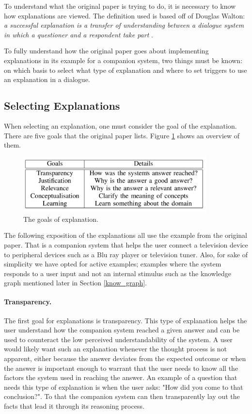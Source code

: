 \documentclass[a4paper]{article}
\begin{document}
To understand what the original paper is trying to do, it is necessary to know how explanations are viewed. The definition used is based off of Douglas Walton: {\it a successful explanation is a transfer of understanding between a dialogue system in which a questioner and a respondent take part} \cite{walton2004new}.

To fully understand how the original paper goes about implementing explanations in its example for a companion system, two things must be known: on which basis to select what type of explanation and where to set triggers to use an explanation in a dialogue.

\subsection{Selecting Explanations}

When selecting an explanation, one must consider the goal of the explanation. There are five goals that the original paper lists. Figure \ref{fig:goals} shows an overview of them.

\begin{figure}[H]
	\centering
	\includegraphics[width=10cm]{goals.png}
	\caption{The goals of explanation.}
	\label{fig:goals}
\end{figure}

The following exposition of the explanations all use the example from the original paper. That is a companion system that helps the user connect a television device to peripheral devices such as a Blu ray player or television tuner. Also, for sake of simplicity we have opted for active examples; examples where the system responds to a user input and not an internal stimulus such as the knowledge graph mentioned later in Section \ref{know_graph}.

\paragraph{Transparency.} The first goal for explanations is transparency. This type of explanation helps the user understand how the companion system reached a given answer and can be used to counteract the low perceived understandability of the system. A user would likely want such an explanation whenever the thought process is not apparent, either because the answer deviates from the expected outcome or when the answer is important enough to warrant that the user needs to know all the factors the system used in reaching the answer. An example of a question that needs this type of explanation is when the user asks: "How did you come to that conclusion?". To that the companion system can then transparently lay out the facts that lead it through its reasoning process.
\end{document}
